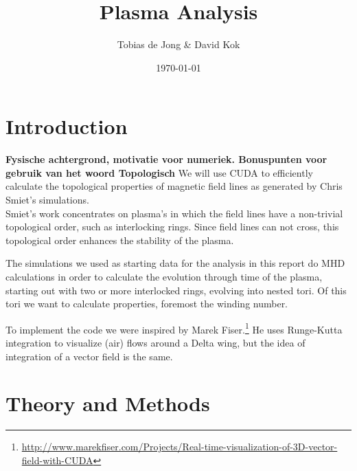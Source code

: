 \documentclass{article}
\begin{document}
\title{Plasma Analysis}
\author{Tobias de Jong \& David Kok}
\date{\today}
\maketitle

\section{Introduction}
{\bf Fysische achtergrond, motivatie voor numeriek. Bonuspunten voor gebruik van het woord Topologisch }
We will use CUDA to efficiently calculate the topological properties of magnetic field lines as generated by Chris Smiet's simulations.\cite{PhysRevLett.115.095001}\\
Smiet's work concentrates on plasma's in which the field lines have a non-trivial topological order, such as interlocking rings. Since field lines can not cross, this topological order enhances the stability of the plasma.

The simulations we used as starting data for the analysis in this report do MHD calculations in order to calculate the evolution through time of the plasma, starting out with two or more interlocked rings, evolving into nested tori.
Of this tori we want to calculate properties, foremost the winding number.

To implement the code we were inspired by Marek Fiser.\footnote{\url{http://www.marekfiser.com/Projects/Real-time-visualization-of-3D-vector-field-with-CUDA}} He uses Runge-Kutta integration to visualize (air) flows around a Delta wing, but the idea of integration of a vector field is the same.

\section{Theory and Methods}
\end{document}
